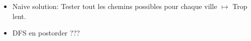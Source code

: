 \begin{frame}
    \frametitle{\problemtitle}
    \begin{itemize}
        \begin{block}{Problème}
            \textbf{Problem:} Un graphe avec $n$ villes et $m$ villes candidates, Trouver la ville candidate dont le cycle est le plus petit.
        \end{block}
        \item<+-> Naive solution: Tester tout les chemins possibles pour chaque ville $\mapsto$ Trop lent.
        \item<+-> DFS en postorder ???
    \end{itemize}
\end{frame}
